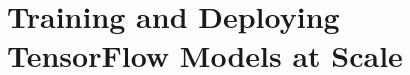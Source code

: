 \chapter{Training and Deploying TensorFlow Models at Scale\label{Training and Deploying TensorFlow Models at Scale}}